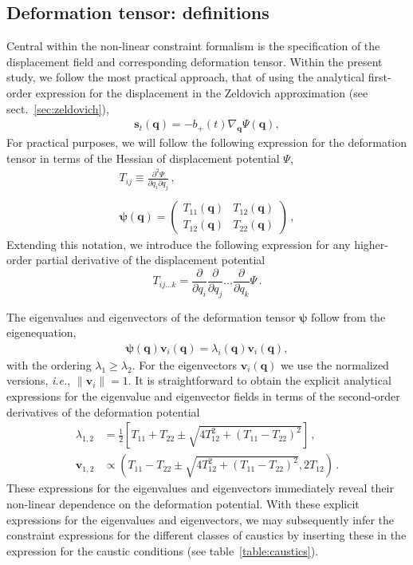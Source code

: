 \documentclass[a4paper, 11pt]{article}
\begin{document}
\subsection{Deformation tensor: definitions}
Central within the non-linear constraint formalism is the specification of the displacement field and corresponding deformation tensor. Within the present study, we follow the most practical approach, that of using the analytical first-order expression for the displacement in the Zeldovich approximation (see sect.~\ref{sec:zeldovich}),
\begin{align}
\bm{s}_t(\bm{q}) = -b_+(t) \nabla_{\bm{q}} \Psi(\bm{q}),
\end{align}
For practical purposes, we will follow the following expression for the deformation tensor in terms of the Hessian of displacement potential $\Psi$, 
\begin{align}
  T_{ij} \equiv \frac{\partial^2 \Psi}{\partial q_i \partial q_j}\,,\\
  \,\\
\bm{\psi}(\bm{q}) = \begin{pmatrix} T_{11}(\bm{q}) & T_{12}(\bm{q}) \\ T_{12}(\bm{q}) & T_{22}(\bm{q})\end{pmatrix}\,,
    \end{align}
Extending this notation, we introduce the following expression for any higher-order partial derivative of the
displacement potential
\begin{equation}
  T_{ij\dots k}=\frac{\partial}{\partial q_i}\frac{\partial}{\partial q_j}\dots \frac{\partial}{\partial q_k}\Psi\,.
  \end{equation}

\bigskip
The eigenvalues and eigenvectors of the deformation tensor $\bm{\psi}$ follow from the eigenequation,
\begin{align}
\bm{\psi}(\bm{q}) \bm{v}_i(\bm{q}) = \lambda_i(\bm{q}) \bm{v}_i(\bm{q}),
\end{align}
with the ordering $\lambda_1\geq \lambda_2$. For the eigenvectors $\bm{v}_i(\bm{q})$ we use the normalized versions, \textit{i.e.}, $\|\bm{v}_{i}\|=1$. It is straightforward to obtain the explicit analytical expressions for the eigenvalue and eigenvector fields in terms of the second-order derivatives of the deformation potential
\begin{align}
\lambda_{1,2} &= \frac{1}{2}\left[T_{11}+T_{22} \pm \sqrt{4 T_{12}^2+(T_{11}-T_{22})^2}\right]\,,\\
\bm{v}_{1,2} &\propto  \left(T_{11}-T_{22} \pm \sqrt{4 T_{12}^2+(T_{11}-T_{22})^2}, 2 T_{12}\right)\,.
\end{align}
These expressions for the eigenvalues and eigenvectors immediately reveal their non-linear dependence on the deformation potential. With these explicit expressions for the eigenvalues and eigenvectors, we may subsequently infer the constraint expressions for the different classes of caustics by inserting these in the expression for the caustic conditions (see table~\ref{table:caustics}). 
\end{document}
